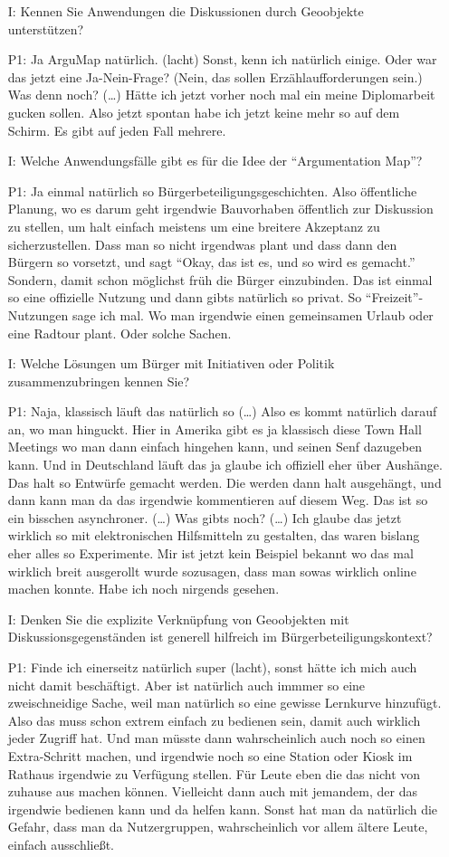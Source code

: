 \begin{itemize}
    \item[I:] Kennen Sie Anwendungen die Diskussionen durch Geoobjekte unterstützen?
    \item[P1:] Ja ArguMap natürlich. (lacht) Sonst, kenn ich natürlich einige. Oder war das jetzt eine Ja-Nein-Frage? (Nein, das sollen Erzählaufforderungen sein.) Was denn noch? (\dots) Hätte ich jetzt vorher noch mal ein meine Diplomarbeit gucken sollen. Also jetzt spontan habe ich jetzt keine mehr so auf dem Schirm. Es gibt auf jeden Fall mehrere.
    \item[I:] Welche Anwendungsfälle gibt es für die Idee der "`Argumentation Map"'?
    \item[P1:] Ja einmal natürlich so Bürgerbeteiligungsgeschichten. Also öffentliche Planung, wo es darum geht irgendwie Bauvorhaben öffentlich zur Diskussion zu stellen, um halt einfach meistens um eine breitere Akzeptanz zu sicherzustellen. Dass man so nicht irgendwas plant und dass dann den Bürgern so vorsetzt, und sagt "`Okay, das ist es, und so wird es gemacht."' Sondern, damit schon möglichst früh die Bürger einzubinden. Das ist einmal so eine offizielle Nutzung und dann gibts natürlich so privat. So "`Freizeit"'-Nutzungen sage ich mal. Wo man irgendwie einen gemeinsamen Urlaub oder eine Radtour plant. Oder solche Sachen.
    \item[I:] Welche Lösungen um Bürger mit Initiativen oder Politik zusammenzubringen kennen Sie?
    \item[P1:] Naja, klassisch läuft das natürlich so (\dots) Also es kommt natürlich darauf an, wo man hinguckt. Hier in Amerika gibt es ja klassisch diese Town Hall Meetings wo man dann einfach hingehen kann, und seinen Senf dazugeben kann. Und in Deutschland läuft das ja glaube ich offiziell eher über Aushänge. Das halt so Entwürfe gemacht werden. Die werden dann halt ausgehängt, und dann kann man da das irgendwie kommentieren auf diesem Weg. Das ist so ein bisschen asynchroner. (\dots) Was gibts noch? (\dots) Ich glaube das jetzt wirklich so mit elektronischen Hilfsmitteln zu gestalten, das waren bislang eher alles so Experimente. Mir ist jetzt kein Beispiel bekannt wo das mal wirklich breit ausgerollt wurde sozusagen, dass man sowas wirklich online machen konnte. Habe ich noch nirgends gesehen.
    \item[I:] Denken Sie die explizite Verknüpfung von Geoobjekten mit Diskussionsgegenständen ist generell hilfreich im Bürgerbeteiligungskontext?
    \item[P1:] Finde ich einerseitz natürlich super (lacht), sonst hätte ich mich auch nicht damit beschäftigt. Aber ist natürlich auch immmer so eine zweischneidige Sache, weil man natürlich so eine gewisse Lernkurve hinzufügt. Also das muss schon extrem einfach zu bedienen sein, damit auch wirklich jeder Zugriff hat. Und man müsste dann wahrscheinlich auch noch so einen Extra-Schritt machen, und irgendwie noch so eine Station oder Kiosk im Rathaus irgendwie zu Verfügung stellen. Für Leute eben die das nicht von zuhause aus machen können. Vielleicht dann auch mit jemandem, der das irgendwie bedienen kann und da helfen kann. Sonst hat man da natürlich die Gefahr, dass man da Nutzergruppen, wahrscheinlich vor allem ältere Leute, einfach ausschließt.

\end{itemize}
